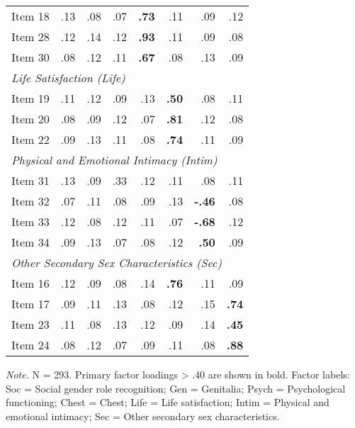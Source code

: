 \documentclass[12pt,a4paper]{article}
\begin{document}
\begin{table}[htbp]
\begin{tabular}{lrrrrrrr}
Item 18 & .13 & .08 & .07 & \textbf{.73} & .11 & .09 & .12\\
Item 28 & .12 & .14 & .12 & \textbf{.93} & .11 & .09 & .08\\
Item 30 & .08 & .12 & .11 & \textbf{.67} & .08 & .13 & .09\\
\midrule
\multicolumn{8}{l}{\textit{Life Satisfaction (Life)}}\\
Item 19 & .11 & .12 & .09 & .13 & \textbf{.50} & .08 & .11\\
Item 20 & .08 & .09 & .12 & .07 & \textbf{.81} & .12 & .08\\
Item 22 & .09 & .13 & .11 & .08 & \textbf{.74} & .11 & .09\\
\midrule
\multicolumn{8}{l}{\textit{Physical and Emotional Intimacy (Intim)}}\\
Item 31 & .13 & .09 & .33 & .12 & .11 & .08 & .11\\
Item 32 & .07 & .11 & .08 & .09 & .13 & \textbf{-.46} & .08\\
Item 33 & .12 & .08 & .12 & .11 & .07 & \textbf{-.68} & .12\\
Item 34 & .09 & .13 & .07 & .08 & .12 & \textbf{.50} & .09\\
\midrule
\multicolumn{8}{l}{\textit{Other Secondary Sex Characteristics (Sec)}}\\
Item 16 & .12 & .09 & .08 & .14 & \textbf{.76} & .11 & .09\\
Item 17 & .09 & .11 & .13 & .08 & .12 & .15 & \textbf{.74}\\
Item 23 & .11 & .08 & .13 & .12 & .09 & .14 & \textbf{.45}\\
Item 24 & .08 & .12 & .07 & .09 & .11 & .08 & \textbf{.88}\\
\bottomrule
\end{tabular}
\begin{tablenotes}
\small
\item \textit{Note.} N = 293. Primary factor loadings > .40 are shown in bold. Factor labels: Soc = Social gender role recognition; Gen = Genitalia; Psych = Psychological functioning; Chest = Chest; Life = Life satisfaction; Intim = Physical and emotional intimacy; Sec = Other secondary sex characteristics.
\end{tablenotes}
\end{table}
\end{document}
